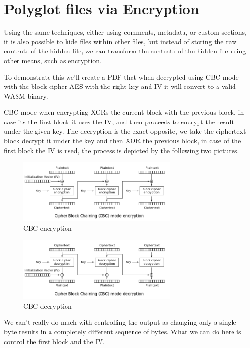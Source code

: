 \section{Polyglot files via Encryption}

Using the same techniques, either using comments, metadata, or custom sections, it is also possible to hide files within other files, 
but instead of storing the raw contents of the hidden file, we can transform the contents of the hidden file using other means, such as encryption.

To demonstrate this we'll create a PDF that when decrypted using CBC mode with the block cipher AES with the right key and IV it will convert to a valid WASM binary.

CBC mode when encrypting XORs the current block with the previous block, in case its the first block it uses the IV, and then proceeds to encrypt the result
under the given key. The decryption is the exact opposite, we take the ciphertext block decrypt it under the key and then XOR the previous block, in case of the first block
the IV is used, the process is depicted by the following two pictures.

\begin{figure}[h]
    \center
    \includegraphics[width=8cm]{images/encryption.png}
    \caption{CBC encryption\cite{cbc}}
\end{figure}

\begin{figure}[h]
    \center
    \includegraphics[width=8cm]{images/decryption.png}
    \caption{CBC decryption\cite{cbc}}
\end{figure}

We can't really do much with controlling the output as changing only a single byte results in a completely different sequence of bytes. What we can do here
is control the first block and the IV.

